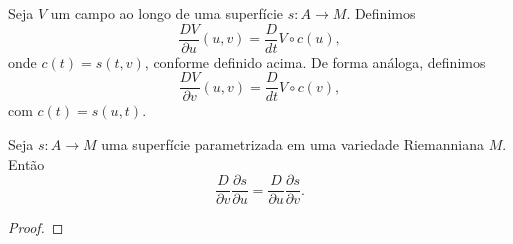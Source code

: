 \begin{definition}
    \label{def:covariantes-parciais-superficie}
    Seja $V$ um campo ao longo de uma superfície $s:A\to M$.
    Definimos
    \begin{equation*}
        \frac{DV}{\partial u}(u,v) = \frac{D}{dt}V\circ c(u),
    \end{equation*}
    onde $c(t)=s(t,v)$, conforme definido acima.
    De forma análoga, definimos
    \begin{equation*}
        \frac{DV}{\partial v}(u,v)=\frac{D}{dt}V \circ  c(v),
    \end{equation*}
    com $c(t)=s(u,t)$.
\end{definition}
\begin{lemma}[Simetria]
    \label{lem:simetria-covariante-superficie}
    Seja $s:A\to M$ uma superfície parametrizada em uma variedade Riemanniana $M$.
    Então
    \begin{equation*}
        \frac{D}{\partial v}\frac{\partial s}{\partial u}=\frac{D}{\partial u}\frac{\partial s}{\partial v}.
    \end{equation*}
    \begin{proof}


\end{proof}
\end{lemma}
